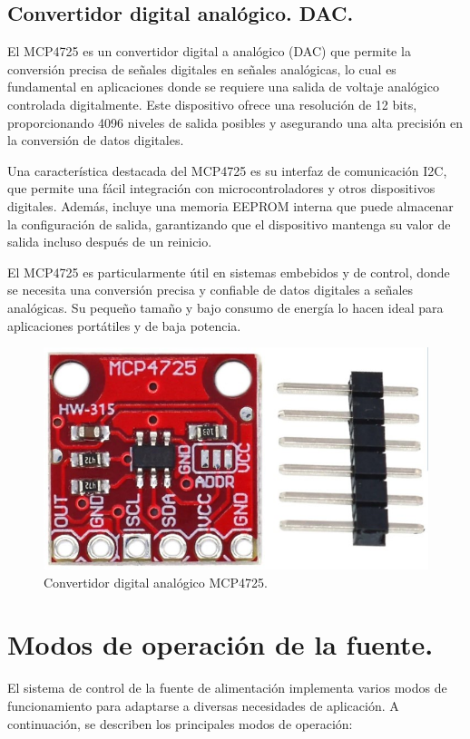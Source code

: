\subsection{Convertidor digital analógico. DAC.}
El MCP4725 es un convertidor digital a analógico (DAC) que permite la conversión precisa de señales digitales en señales analógicas, lo cual es fundamental en aplicaciones donde se requiere una salida de voltaje analógico controlada digitalmente. Este dispositivo ofrece una resolución de 12 bits, proporcionando 4096 niveles de salida posibles y asegurando una alta precisión en la conversión de datos digitales.

Una característica destacada del MCP4725 es su interfaz de comunicación I2C, que permite una fácil integración con microcontroladores y otros dispositivos digitales. Además, incluye una memoria EEPROM interna que puede almacenar la configuración de salida, garantizando que el dispositivo mantenga su valor de salida incluso después de un reinicio.

El MCP4725 es particularmente útil en sistemas embebidos y de control, donde se necesita una conversión precisa y confiable de datos digitales a señales analógicas. Su pequeño tamaño y bajo consumo de energía lo hacen ideal para aplicaciones portátiles y de baja potencia.

\begin{figure}[H]
    \centering
    \includegraphics[scale=0.3]{./imagenes/mcp4725.jpg}
    \caption{Convertidor digital analógico MCP4725.}
    \label{F:DAC}
\end{figure}

\section{Modos de operación de la fuente.}
El sistema de control de la fuente de alimentación implementa varios modos de funcionamiento para adaptarse a diversas necesidades de aplicación. A continuación, se describen los principales modos de operación: \par 
